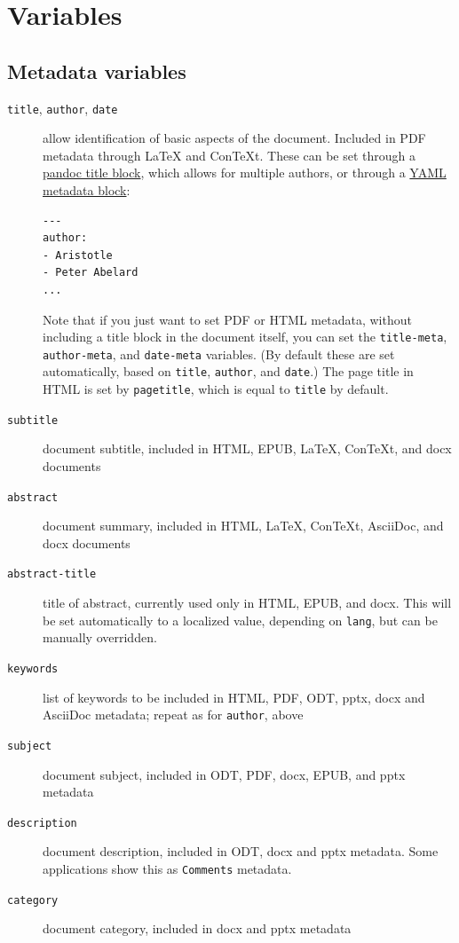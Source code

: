 \documentclass[
  b5paper
]{book}
\begin{document}
\section{Variables}\label{variables}

\subsection{Metadata variables}\label{metadata-variables}

\begin{description}
\item[\texttt{title}, \texttt{author}, \texttt{date}]
allow identification of basic aspects of the document. Included in PDF
metadata through LaTeX and ConTeXt. These can be set through a
\hyperref[extension-pandoc_title_block]{pandoc title block}, which
allows for multiple authors, or through a
\hyperref[extension-yaml_metadata_block]{YAML metadata block}:

\begin{verbatim}
---
author:
- Aristotle
- Peter Abelard
...
\end{verbatim}

Note that if you just want to set PDF or HTML metadata, without
including a title block in the document itself, you can set the
\texttt{title-meta}, \texttt{author-meta}, and \texttt{date-meta}
variables. (By default these are set automatically, based on
\texttt{title}, \texttt{author}, and \texttt{date}.) The page title in
HTML is set by \texttt{pagetitle}, which is equal to \texttt{title} by
default.
\item[\texttt{subtitle}]
document subtitle, included in HTML, EPUB, LaTeX, ConTeXt, and docx
documents
\item[\texttt{abstract}]
document summary, included in HTML, LaTeX, ConTeXt, AsciiDoc, and docx
documents
\item[\texttt{abstract-title}]
title of abstract, currently used only in HTML, EPUB, and docx. This
will be set automatically to a localized value, depending on
\texttt{lang}, but can be manually overridden.
\item[\texttt{keywords}]
list of keywords to be included in HTML, PDF, ODT, pptx, docx and
AsciiDoc metadata; repeat as for \texttt{author}, above
\item[\texttt{subject}]
document subject, included in ODT, PDF, docx, EPUB, and pptx metadata
\item[\texttt{description}]
document description, included in ODT, docx and pptx metadata. Some
applications show this as \texttt{Comments} metadata.
\item[\texttt{category}]
document category, included in docx and pptx metadata
\end{description}
\end{document}
